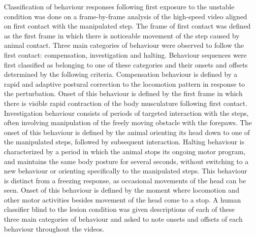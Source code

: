 Classification of behaviour responses following first exposure to the unstable condition was done on a frame-by-frame analysis of the high-speed video aligned on first contact with the manipulated step. The frame of first contact was defined as the first frame in which there is noticeable movement of the step caused by animal contact. Three main categories of behaviour were observed to follow the first contact: compensation, investigation and halting. Behaviour sequences were first classified as belonging to one of these categories and their onsets and offsets determined by the following criteria. Compensation behaviour is defined by a rapid and adaptive postural correction to the locomotion pattern in response to the perturbation. Onset of this behaviour is defined by the first frame in which there is visible rapid contraction of the body musculature following first contact. Investigation behaviour consists of periods of targeted interaction with the steps, often involving manipulation of the freely moving obstacle with the forepaws. The onset of this behaviour is defined by the animal orienting its head down to one of the manipulated steps, followed by subsequent interaction. Halting behaviour is characterized by a period in which the animal stops its ongoing motor program, and maintains the same body posture for several seconds, without switching to a new behaviour or orienting specifically to the manipulated steps. This behaviour is distinct from a freezing response, as occasional movements of the head can be seen. Onset of this behaviour is defined by the moment where locomotion and other motor activities besides movement of the head come to a stop. A human classifier blind to the lesion condition was given descriptions of each of these three main categories of behaviour and asked to note onsets and offsets of each behaviour throughout the videos.
